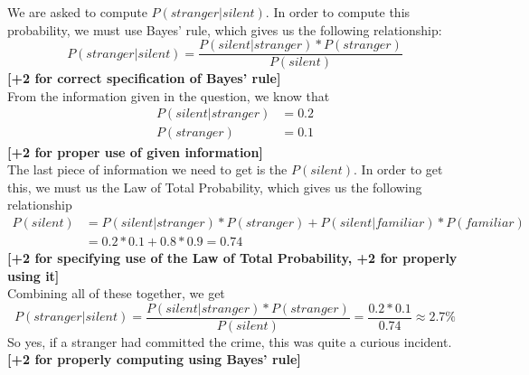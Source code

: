 \documentclass[addpoints,12pt]{exam}
\begin{document}
\begin{questions}
\begin{parts}
			\begin{solution}
			We are asked to compute $P(stranger | silent)$. In order to compute this probability, we must use Bayes' rule, which gives us the following relationship: 
			$$
			P(stranger | silent) = \frac{P(silent | stranger) * P(stranger)}{P(silent)}
			$$
			\textbf{[+2 for correct specification of Bayes' rule]}\\
			 From the information given in the question, we know that 
			 \begin{align*}
			 P(silent | stranger) &= 0.2
			 \\
			 P(stranger) &= 0.1 
			 \end{align*}
			 \textbf{[+2 for proper use of given information]}\\
			 The last piece of information we need to get is the $P(silent)$. In order to get this, we must us the Law of Total Probability, which gives us the following relationship 
			 \begin{align*}
			 P(silent) &= P(silent | stranger) * P(stranger) + P(silent | familiar) * P(familiar) 
			 \\
			 &= 0.2 * 0.1 + 0.8 * 0.9 = 0.74
			 \end{align*}
			 \textbf{[+2 for specifying use of the Law of Total Probability, +2 for properly using it]}\\
			 Combining all of these together, we get
			$$
			P(stranger | silent) = \frac{P(silent | stranger) * P(stranger)}{P(silent)} = \frac{0.2 * 0.1}{0.74} \approx 2.7\%
			$$
			So yes, if a stranger had committed the crime, this was quite a curious incident.
			\textbf{[+2 for properly computing using Bayes' rule]}
			\end{solution}
		\end{parts}
\end{questions}
\end{document}
